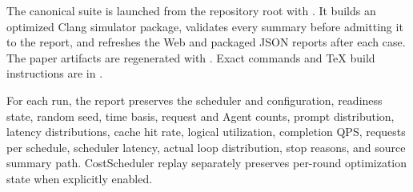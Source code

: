\documentclass[10pt]{article}
\begin{document}
The canonical suite is launched from the repository root with
.
It builds an optimized
Clang simulator package, validates every summary before admitting it to the
report, and refreshes the Web and packaged JSON reports after each case. The
paper artifacts are regenerated with
. Exact commands
and TeX build instructions are in .

For each run, the report preserves the scheduler and configuration, readiness
state, random seed, time basis, request and Agent counts, prompt distribution,
latency distributions, cache hit rate, logical utilization, completion QPS,
requests per schedule, scheduler latency, actual loop distribution, stop
reasons, and source summary path. CostScheduler replay separately preserves
per-round optimization state when explicitly enabled.



\end{document}
